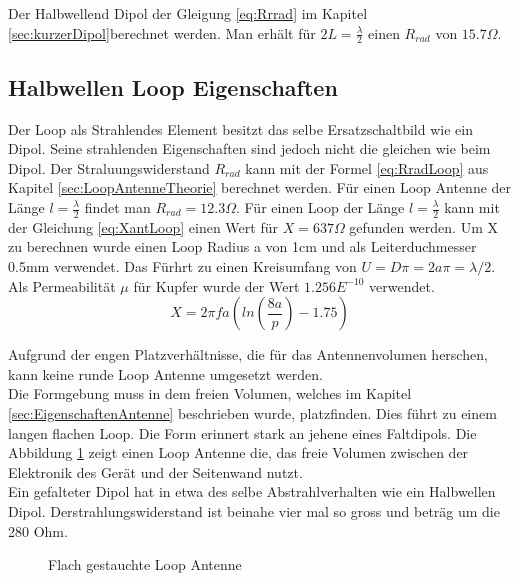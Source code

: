 Der Halbwellend Dipol der Gleigung \ref{eq:Rrrad} im Kapitel \ref{sec:kurzerDipol}berechnet werden. Man erhält für $2L = \frac{\lambda}{2}$ einen $R_{rad}$ von $15.7 \Omega $.

\subsection{Halbwellen Loop Eigenschaften}
Der Loop als Strahlendes Element besitzt das selbe Ersatzschaltbild wie ein Dipol. Seine strahlenden Eigenschaften sind jedoch nicht die gleichen wie beim Dipol. Der Straluungswiderstand $R_{rad}$ kann mit der Formel \ref{eq:RradLoop} aus Kapitel \ref{sec:LoopAntenneTheorie} berechnet werden. Für einen Loop Antenne der Länge $l=\frac{\lambda}{2}$ findet man $R_{rad} = 12.3\Omega$. Für einen Loop der Länge $l=\frac{\lambda}{2}$ kann mit der Gleichung \ref{eq:XantLoop} einen Wert für $X = 637 \Omega$ gefunden werden. Um X zu berechnen wurde einen Loop Radius a von 1cm und als Leiterduchmesser 0.5mm verwendet. Das Fürhrt zu einen Kreisumfang von $U=D\pi=2a\pi=\lambda /2$. Als Permeabilität $\mu $ für Kupfer wurde der Wert $1.256E^{-10}$ verwendet.
\begin{equation}\label{eq:XantLoop}
X= 2\pi f a(ln \left( \frac{8a}{p} \right) - 1.75)
\end{equation}

Aufgrund der engen Platzverhältnisse, die für das Antennenvolumen herschen, kann keine runde Loop Antenne umgesetzt werden. \\
Die Formgebung muss in dem freien Volumen, welches im Kapitel \ref{sec:EigenschaftenAntenne} beschrieben wurde, platzfinden. Dies führt zu einem langen flachen Loop. Die Form erinnert stark an jehene eines Faltdipols. Die Abbildung \ref{fig:FflacheLoopAntenne} zeigt einen Loop Antenne die, das freie Volumen zwischen der Elektronik des Gerät und der Seitenwand nutzt.\\
 Ein gefalteter Dipol hat in etwa des selbe Abstrahlverhalten wie ein Halbwellen Dipol. Derstrahlungswiderstand ist beinahe vier mal so gross und beträg um die 280 Ohm. 
\begin{figure}[h]
	\begin{center}
	\end{center}
\caption{Flach gestauchte Loop Antenne}
\label{fig:FflacheLoopAntenne}
\end{figure}
